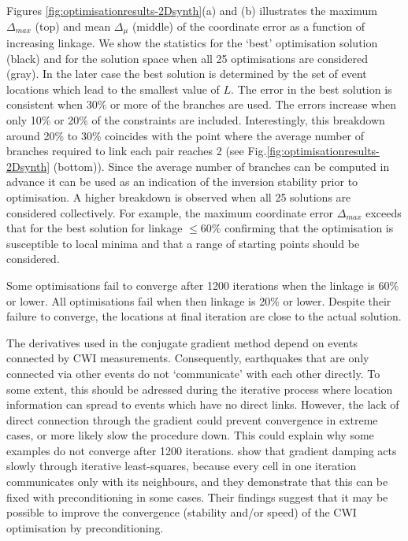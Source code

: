 \documentclass[extra, onecolumn, doublespacing]{gji}
\begin{document}
Figures \ref{fig:optimisationresults-2Dsynth}(a) and (b) illustrates
the maximum $\Delta_{max}$ (top) and mean $\Delta_\mu$ (middle) of
the coordinate error as a function of increasing linkage. We show
the statistics for the `best' optimisation solution (black) and for
the solution space when all 25 optimisations are considered (gray).
In the later case the best solution is determined by the set of
event locations which lead to the smallest value of $L$. The error
in the best solution is consistent when 30\% or more of the branches
are used. The errors increase when only 10\% or 20\% of the
constraints are included. Interestingly, this breakdown around 20\%
to 30\% coincides with the point where the average number of
branches required to link each pair reaches 2 (see
Fig.\ref{fig:optimisationresults-2Dsynth} (bottom)). Since the
average number of branches can be computed in advance it can be used
as an indication of the inversion stability prior to optimisation. A
higher breakdown is observed when all 25 solutions are considered
collectively. For example, the maximum coordinate error
$\Delta_{max}$ exceeds that for the best solution for linkage
$\leq$60\% confirming that the optimisation is susceptible to local
minima and that a range of starting points should be considered.

Some optimisations fail to converge after 1200 iterations when the
linkage is 60\% or lower. All optimisations fail when then linkage
is 20\% or lower. Despite their failure to converge, the locations
at final iteration are close to the actual solution.

The derivatives used in the conjugate gradient method depend on
events connected by CWI measurements. Consequently, earthquakes that
are only connected via other events do not `communicate' with each
other directly. To some extent, this should be adressed during the
iterative process where location information can spread to events
which have no direct links. However, the lack of direct connection
through the gradient could prevent convergence in extreme cases, or
more likely slow the procedure down. This could explain why some
examples do not converge after 1200 iterations.
\citet{dr_VanDecar94a} show that gradient damping acts slowly
through iterative least-squares, because
 every cell in one iteration communicates only with its neighbours, and they demonstrate that this can be
fixed with preconditioning in some cases. Their findings suggest that it may be possible to improve
the convergence (stability and/or speed) of the CWI optimisation by preconditioning.
\end{document}
